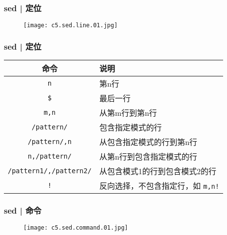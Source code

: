 \begin{frame}
  \frametitle{sed | 定位}
  \begin{figure}
    \centering
    \texttt{[image: c5.sed.line.01.jpg]}
  \end{figure}
\end{frame}

\begin{frame}[fragile]
  \frametitle{sed | \alert{定位}}
  \begin{table}
    \centering
    \begin{tabularx}{\textwidth}{cX}
      \hline
      \rowcolor{blue!50}命令 & 说明\\
      \hline
      \verb|n| & 第n行\\
      \verb|$| & 最后一行\\
      \verb|m,n| & 从第m行到第n行\\
      \verb|/pattern/| & 包含指定模式的行\\
      \verb|/pattern/,n| & 从包含指定模式的行到第n行\\
      \verb|n,/pattern/| & 从第n行到包含指定模式的行\\
      \verb|/pattern1/,/pattern2/| & 从包含模式1的行到包含模式2的行\\
      \verb|!| & 反向选择，不包含指定行，如 \verb|m,n!|\\
      \hline
    \end{tabularx}
  \end{table}
\end{frame}

\begin{frame}
  \frametitle{sed | 命令}
  \begin{figure}
    \centering
    \texttt{[image: c5.sed.command.01.jpg]}
  \end{figure}
\end{frame}

